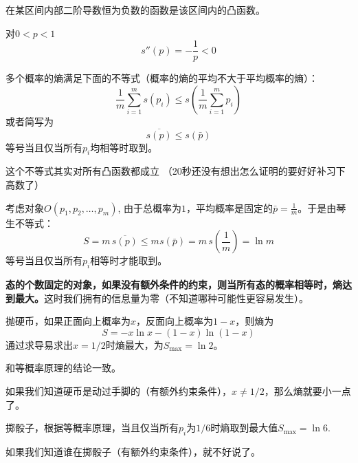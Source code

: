 \documentclass[CJK]{beamer}
\begin{document}
\begin{frame}
\bch
{}
\emini
{}
在某区间内部二阶导数恒为负数的函数是该区间内的凸函数。

对$0<p<1$
$$s''(p)  = -\frac{1}{p}<0$$
\emini
\ech
\end{frame}


\begin{frame}
\bch
多个概率的熵满足下面的不等式（{\blue 概率的熵的平均不大于平均概率的熵}）：
$$\frac{1}{m}\sum_{i=1}^m s(p_i) \le  s\left(\frac{1}{m}\sum_{i=1}^m p_i\right)$$
或者简写为{\blue
$$\overline{s(p)} \le s(\bar{p})$$
等号当且仅当所有$p_i$均相等时取到}。


\skiplines

这个不等式其实对所有凸函数都成立 （20秒还没有想出怎么证明的要好好补习下高数了\bye）
\ech
\end{frame}


\begin{frame}
\bch
考虑对象$O(p_1, p_2,\ldots, p_m)$, 由于总概率为$1$，平均概率是固定的$\bar{p} =  \frac{1}{m}$。于是由琴生不等式：
$$ S = m\, \overline{s(p)} \le m s(\bar{p}) = m\, s\left(\frac{1}{m}\right) = \ln m$$
等号当且仅当所有$p_i$相等时才能取到。

\skipline

{\bf \blue 态的个数固定的对象，如果没有额外条件的约束，则当所有态的概率相等时，熵达到最大。}这时我们拥有的信息量为零（不知道哪种可能性更容易发生）。

\ech
\end{frame}

\begin{frame}
\bch

\emini
{}
抛硬币，如果正面向上概率为$x$，反面向上概率为$1-x$，则熵为
$$S = -x\ln x - (1-x)\ln (1-x)$$
通过求导易求出$x = 1/2$时熵最大，为$S_{\max} = \ln 2$。

和等概率原理的结论一致。
\emini

\skiplines

如果我们知道硬币是动过手脚的（有额外约束条件），$x\ne 1/2$，那么熵就要小一点了。
\ech
\end{frame}


\begin{frame}
\bch
{}
\emini
{}
掷骰子，根据等概率原理，当且仅当所有$p_i$为$1/6$时熵取到最大值$S_{\max} = \ln 6$.
\emini

\skiplines

\emini
{}
如果我们知道谁在掷骰子（有额外约束条件），就不好说了。
\emini
\ech
\end{frame}
\end{document}

